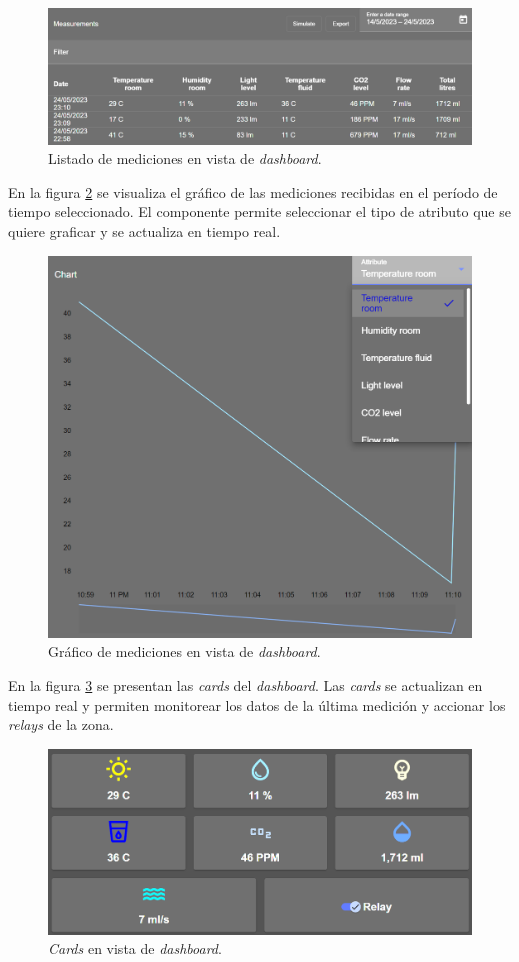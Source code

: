 \begin{figure}[H]
	\centering
	\includegraphics[width=.9\textwidth]{./Figures/Frontend dashboard de zona tabla.png}
	\caption{Listado de mediciones en vista de \textit{dashboard}.}
	\label{fig:tablaMedicionesDashboardDeZona}
\end{figure}

En la figura \ref{fig:graficoMedicionesDashboardDeZona} se visualiza el gráfico de las mediciones recibidas en el período de tiempo seleccionado. El componente permite seleccionar el tipo de atributo que se quiere graficar y se actualiza en tiempo real.

\begin{figure}[H]
	\centering
	\includegraphics[width=.7\textwidth]{./Figures/Frontend dashboard de zona grafico.png}
	\caption{Gráfico de mediciones en vista de \textit{dashboard}.}
	\label{fig:graficoMedicionesDashboardDeZona}
\end{figure}

En la figura \ref{fig:cardsDashboardDeZona} se presentan las \emph{cards} del \emph{dashboard}. Las \textit{cards} se actualizan en tiempo real y permiten monitorear los datos de la última medición y accionar los \textit{relays} de la zona. 

\begin{figure}[H]
	\centering
	\includegraphics[width=.7\textwidth]{./Figures/Frontend dashboard de zona cards.png}
	\caption{\textit{Cards} en vista de \textit{dashboard}.}
	\label{fig:cardsDashboardDeZona}
\end{figure}

